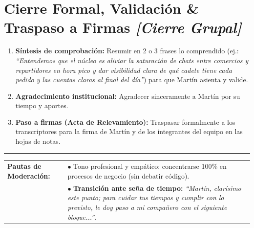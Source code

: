 \documentclass[11pt,a4paper]{article}
\begin{document}
\section*{Cierre Formal, Validación \& Traspaso a Firmas \hfill \normalfont\small\itshape [Cierre Grupal]}
\begin{enumerate}[label=\textbf{\arabic*.}]
  \item \textbf{Síntesis de comprobación:} Resumir en 2 o 3 frases lo comprendido (ej.: \textit{``Entendemos que el núcleo es aliviar la saturación de chats entre comercios y repartidores en hora pico y dar visibilidad clara de qué cadete tiene cada pedido y las cuentas claras al final del día''}) para que Martín asienta y valide.
  \item \textbf{Agradecimiento institucional:} Agradecer sinceramente a Martín por su tiempo y aportes.
  \item \textbf{Paso a firmas (Acta de Relevamiento):} Traspasar formalmente a los transcriptores para la firma de Martín y de los integrantes del equipo en las hojas de notas.
\end{enumerate}

\vspace{8pt}
\hrule
\vspace{5pt}

\noindent
\begin{tabularx}{\textwidth}{@{}l X@{}}
\small\textbf{Pautas de Moderación:} & 
\small
$\bullet$ Tono profesional y empático; concentrarse 100\% en procesos de negocio (sin debatir código). \\
& \small $\bullet$ \textbf{Transición ante seña de tiempo:} \textit{``Martín, clarísimo este punto; para cuidar tus tiempos y cumplir con lo previsto, le doy paso a mi compañero con el siguiente bloque...''}.
\end{tabularx}
\end{document}
